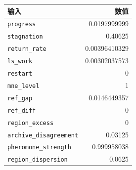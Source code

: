 \begin{tabular}{@{}lr@{}}
\toprule
输入 & 数值 \\ \midrule
\texttt{progress} & 0.0197999999 \\
\texttt{stagnation} & 0.40625 \\
\texttt{return\_rate} & 0.00396410329 \\
\texttt{ls\_work} & 0.00302037573 \\
\texttt{restart} & 0 \\
\texttt{mne\_level} & 1 \\
\texttt{ref\_gap} & 0.0146449357 \\
\texttt{ref\_diff} & 0 \\
\texttt{region\_excess} & 0 \\
\texttt{archive\_disagreement} & 0.03125 \\
\texttt{pheromone\_strength} & 0.999958038 \\
\texttt{region\_dispersion} & 0.0625 \\
\bottomrule
\end{tabular}
